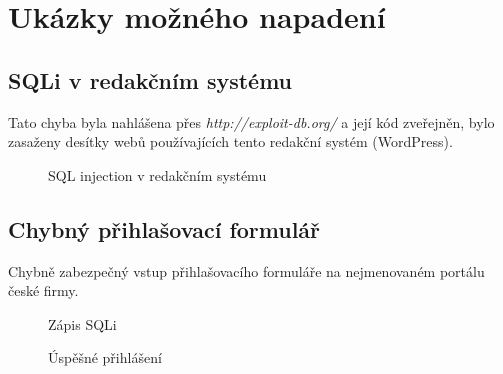 \documentclass[12pt, a4paper]{report}
\begin{document}
\section{Ukázky možného napadení}
\subsection{SQLi v redakčním systému}
Tato chyba byla nahlášena přes \textit{http://exploit-db.org/} a její kód zveřejněn, bylo zasaženy desítky webů používajících tento redakční systém (WordPress).
\begin{figure}[h!]
\caption{SQL injection v redakčním systému}
\label{obr.squash}
\end{figure}

\subsection{Chybný přihlašovací formulář}
Chybně zabezpečný vstup přihlašovacího formuláře na nejmenovaném portálu české firmy.
\begin{figure}[h!]
\caption{Zápis SQLi}
\label{obr.login1}
\end{figure}

\begin{figure}[h!]
\caption{Úspěšné přihlášení}
\label{obr.login2}
\end{figure}
\end{document}
